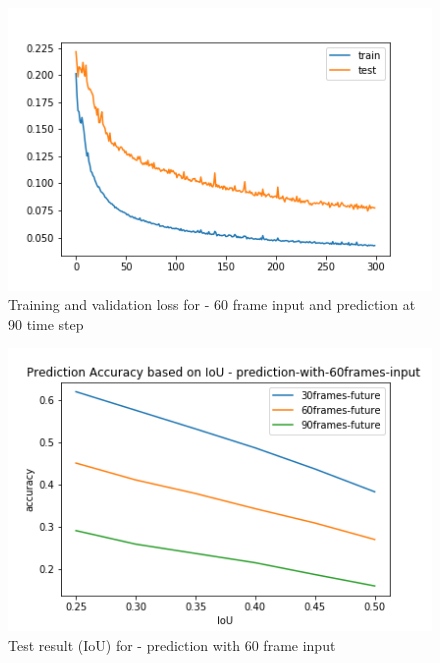 \begin{figure}[H] 
\includegraphics[scale=0.8]{conf13_300e_60_90ffuture}
\begin{center}
\caption{Training and validation loss for - 60 frame input and prediction at 90 time step }
\label{60-90}
\end{center}
\end{figure}

\begin{figure}[H] 
\includegraphics[scale=0.8]{prediction-with-60frames-input_IoU.png}
\begin{center}
\caption{Test result (IoU) for - prediction with 60 frame input}
\label{60-IoU}
\end{center}
\end{figure}

